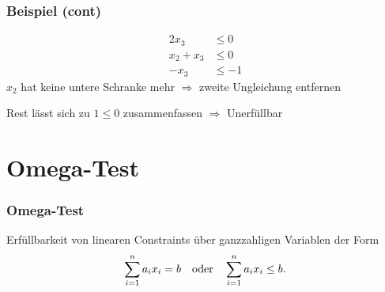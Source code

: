 \documentclass[hyperref={pdfpagelabels=false}]{beamer}
\begin{document}
\begin{frame}
	\frametitle{Beispiel (cont)}
	\begin{align*}
		2x_3 &\leq 0 \\
		x_2 + x_3 &\leq 0 \\
		-x_3 &\leq -1
	\end{align*}
	$x_2$ hat keine untere Schranke mehr $\Rightarrow$ zweite Ungleichung entfernen

	Rest lässt sich zu $1 \leq 0$ zusammenfassen $\Rightarrow$ Unerfüllbar
\end{frame}
\section{Omega-Test}
\begin{frame}
	\frametitle{Omega-Test}
	Erfüllbarkeit von linearen Constraints über ganzzahligen Variablen der Form
	\[ \sum_{i=1}^n a_i x_i = b \text{\quad oder\quad }  \sum_{i=1}^n a_i x_i \leq b. \]
\end{frame}
\end{document}
